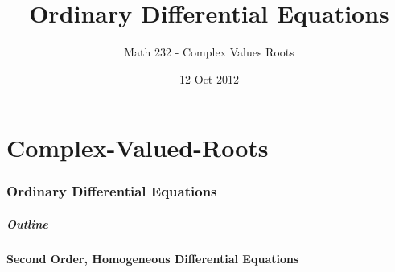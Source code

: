 \part{Complex-Valued-Roots}
\section{Ordinary Differential Equations}

\title{Ordinary Differential Equations}
\subtitle{Math 232 - Complex Values Roots}
\date{12 Oct 2012}

\begin{frame}
  \titlepage
\end{frame}

\begin{frame}
  \frametitle{Outline}
  \tableofcontents[currentsection]
\end{frame}


\subsection{Second Order, Homogeneous Differential Equations}

